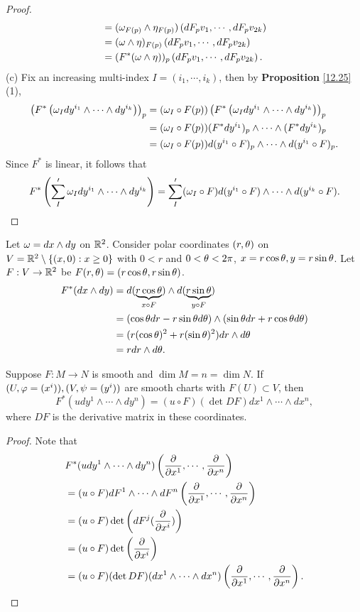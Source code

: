 \begin{proof}
\begin{align*}
    &= (\omega_{F(p)} \wedge \eta_{F(p)})\left( dF_p v_1,\cdots,dF_p v_{2k} \right) \\
    &= (\omega \wedge \eta)_{F(p)}\left( dF_p v_1,\cdots,dF_p v_{2k} \right) \\
    &= (F^*(\omega \wedge \eta))_p\left( dF_p v_1,\cdots,dF_p v_{2k} \right).
    \end{align*}
    (c) Fix an increasing multi-index $I = (i_1,\cdots,i_k)$, then by \textbf{Proposition} \ref{12.25} (1),
    \begin{align*}
    \left( F^*\left(\omega_I dy^{i_1} \wedge \cdots \wedge dy^{i_k}\right) \right)_p
    &= (\omega_I \circ F(p)) \left( F^*\left(\omega_I dy^{i_1} \wedge \cdots \wedge dy^{i_k}\right) \right)_p \\
    &= (\omega_I \circ F(p)) (F^*dy^{i_1})_p \wedge \cdots \wedge (F^*dy^{i_k})_p \\
    &= (\omega_I \circ F(p)) d(y^{i_1} \circ F)_p \wedge \cdots \wedge d(y^{i_1} \circ F)_p.
    \end{align*}
    Since $F^*$ is linear, it follows that 
    $$F^*\left(\sum_{I}' \omega_I dy^{i_1} \wedge \cdots \wedge dy^{i_k} \right)
    = \sum_I'(\omega_I \circ F) d(y^{i_1} \circ F) \wedge \cdots \wedge d(y^{i_k} \circ F).$$
\end{proof}
\begin{example}\label{14.19}
    Let $\omega = dx \wedge dy$ on $\mathbb{R}^2$. Consider polar coordinates $(r,\theta)$ on $V=\mathbb{R}^2 \setminus \{(x,0): x \geq 0\}$ with $0<r$ and $0<\theta<2\pi$, $x = r\cos \theta, y = r\sin \theta$.
    Let $F:V \to \mathbb{R}^2$ be $F(r,\theta) = (r\cos \theta, r\sin \theta)$. 
    \begin{align*}
    F^*(dx \wedge dy) 
    &= d(\underbrace{r\cos \theta}_{x \circ F}) \wedge d(\underbrace{r \sin \theta}_{y \circ F}) \\
    &= (\cos \theta dr - r\sin \theta d\theta) \wedge (\sin \theta dr + r\cos \theta d\theta) \\
    &= (r(\cos \theta)^2 + r(\sin \theta)^2) dr \wedge d\theta \\
    &= rdr \wedge d\theta.
    \end{align*}
\end{example}
\begin{proposition}\label{14.20}
    Suppose $F:M \to N$ is smooth and $\dim M = n = \dim N$. If $(U,\varphi=(x^i)), (V,\psi=(y^i))$ are smooth charts with $F(U) \subset V$, then 
    $$F^*(u dy^1 \wedge \cdots \wedge dy^n) = (u \circ F) (\det DF) dx^1 \wedge \cdots \wedge dx^n, $$ where $DF$ is the derivative matrix in these coordinates. 
\end{proposition}
\begin{proof}
    Note that 
    \begin{align*}
    &F^*(udy^1 \wedge \cdots \wedge dy^n)\left(
    \pdv{}{x^1}, \cdots, \pdv{}{x^n}
    \right) \\
    &= (u \circ F)dF^1 \wedge \cdots \wedge dF^n\left(
    \pdv{}{x^1}, \cdots, \pdv{}{x^n}
    \right) \\
    &= (u \circ F) \det \left(
    dF^j(\pdv{}{x^i})
    \right) \\
    &= (u \circ F) \det \left(
    \pdv{}{x^i}
    \right) \\
    &= (u \circ F)(\det DF)(dx^1 \wedge \cdots \wedge dx^n) \left(
    \pdv{}{x^1}, \cdots, \pdv{}{x^n}
    \right).
    \end{align*}
\end{proof}
